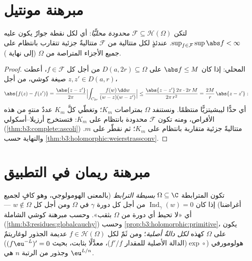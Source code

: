 \section{مبرهنة مونتيل}

\begin{theorem}[مونتيل]\label{thm:b3:conformal:montel}
لتكن $\mathcal F \subseteq \mathcal H(\Omega)$ \emph{محدودة محليًّا}: أي لكل نقطة جوارٌ يكون عليه
$\sup_{f\in
\mathcal F}\sup\abs f < \infty$. عندئذٍ لكل متتالية من $\mathcal F$ متتاليةٌ جزئية
تتقارب بانتظام على جميع الأجزاء المتراصة من $\Omega$ (إلى نهاية
).
\end{theorem}

\begin{proof}
 المحلي: إذا كان $\abs f \leq M$ على $D(a, 2r)
\subseteq \Omega$ من أجل
كل $f \in \mathcal F$، أعطت صيغة كوشي، من أجل $z, z' \in D(a, r)$،
\[
\abs{f(z) - f(z')} = \frac{\abs{z - z'}}{2\pi}
\Bigl|\int_{C_{2r}}\frac{f(w)\,\dd w}{(w-z)(w-z')}\Bigr|
\leq \frac{\abs{z - z'}\,2\pi\cdot2r\,M}{2\pi\,r^2}
= \frac{2M}{r}\,\abs{z - z'} :
\]
أي حدًّا ليبشيتزيًّا منتظمًا. ونستنفد $\Omega$ بمتراصات $K_m$؛
وتغطّي كلَّ $K_m$ عددٌ منتهٍ من هذه الأقراص، ومنه تكون
$\mathcal F$ محدودة بانتظام  على $K_m$: فتستخرج
أرزيلا--أسكولي (\cref{thm:b3:complete:ascoli}) متتاليةً جزئية متقاربة بانتظام على
$K_m$؛ ثم نقطّر على $m$. والنهاية  حسب \cref{thm:b3:holomorphic:weierstrassconv}.
\end{proof}

\section{مبرهنة ريمان في التطبيق}

\begin{definition}\label{def:b3:conformal:simplyconnected}
تكون  المترابطة $\Omega \subseteq \C$ \emph{بسيطة
الترابط} (بالمعنى الهومولوجي، وهو كافٍ
لجميع أغراضنا) إذا كان $\operatorname{Ind}_\gamma(w) = 0$ من أجل كل دورة $\gamma$ في
$\Omega$ ومن أجل كل $w \notin \Omega$ --- أي «لا تحيط أي دورة من $\Omega$
بثقب». وحسب مبرهنة كوشي الشاملة (\cref{thm:b3:residues:globalcauchy}) وحسب \cref{prop:b3:holomorphic:primitive}،
يكون على $\Omega$ كهذه \emph{لكل  دالةٌ أصلية}؛
ومن ثَمّ لكل $f \in \mathcal H(\Omega)$ عديمة الجذور لوغاريتمٌ هولومورفي
($\exp\circ$(الدالة الأصلية للمقدار $f'/f$)، معدَّلًا بثابت،
بحيث $(f\eu^{-L})' = 0$) وجذور  من الرتبة $n$ هي
$\eu^{L/n}$.
\end{definition}

